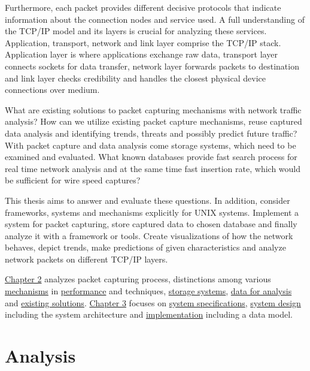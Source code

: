 \documentclass[12pt,a4paper,twoside]{report}
\begin{document}
	Furthermore, each packet provides different decisive protocols that indicate information about the connection nodes and service used. A full understanding of the TCP/IP model and its layers is crucial for analyzing these services. Application, transport, network and link layer comprise the TCP/IP stack. Application layer is where applications exchange raw data, transport layer connects sockets for data transfer, network layer forwards packets to destination and link layer checks credibility and handles the closest physical device connections over medium.\par
	What are existing solutions to packet capturing mechanisms with network traffic analysis? How can we utilize existing packet capture mechanisms, reuse captured data analysis and identifying trends, threats and possibly predict future traffic? With packet capture and data analysis come storage systems, which need to be examined and evaluated. What known databases provide fast search process for real time network analysis and at the same time fast insertion rate, which would be sufficient for wire speed captures?\par
	This thesis aims to answer and evaluate these questions. In addition, consider frameworks, systems and mechanisms explicitly for UNIX systems. Implement a system for packet capturing, store captured data to chosen database and finally analyze it with a framework or tools. Create visualizations of how the network behaves, depict trends, make predictions of given characteristics and analyze network packets on different TCP/IP layers.\par
	\hyperref[analysis]{Chapter 2} analyzes packet capturing process, distinctions among various \hyperref[analysis:mechs]{mechanisms} in \hyperref[analysis:testing]{performance} and techniques, \hyperref[analysis:storage]{storage systems}, \hyperref[analysis:data]{data for analysis} and  \hyperref[analysis:solutions]{existing solutions}. \hyperref[solution]{Chapter 3} focuses on \hyperref[solution:spec]{system specifications}, \hyperref[solution:design]{system design} including the system architecture and \hyperref[solution:implementation]{implementation} including a data model.
\chapter{Analysis} \label{analysis}
\end{document}
